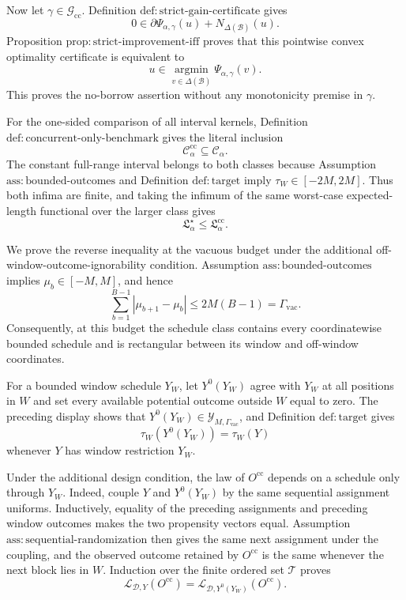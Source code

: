 Now let \(\gamma\in\mathcal G_{\mathrm{cc}}\).  Definition \(\mathrm{def:strict\text{-}gain\text{-}certificate}\) gives
\[
 0\in\partial\Psi_{\alpha,\gamma}(u)
      +N_{\Delta(\mathcal B)}(u).
\]
Proposition \(\mathrm{prop:strict\text{-}improvement\text{-}iff}\) proves that this pointwise convex optimality certificate is equivalent to
\[
 u\in\operatorname*{argmin}_{v\in\Delta(\mathcal B)}
 \Psi_{\alpha,\gamma}(v).
\]
This proves the no-borrow assertion without any monotonicity premise in \(\gamma\).

For the one-sided comparison of all interval kernels, Definition \(\mathrm{def:concurrent\text{-}only\text{-}benchmark}\) gives the literal inclusion
\[
 \mathcal C_\alpha^{\mathrm{cc}}\subseteq\mathcal C_\alpha.
\]
The constant full-range interval belongs to both classes because Assumption \(\mathrm{ass:bounded\text{-}outcomes}\) and Definition \(\mathrm{def:target}\) imply \(\tau_W\in[-2M,2M]\).  Thus both infima are finite, and taking the infimum of the same worst-case expected-length functional over the larger class gives
\[
 \mathfrak L_\alpha^\star\le\mathfrak L_\alpha^{\mathrm{cc}}.
\]

We prove the reverse inequality at the vacuous budget under the additional off-window-outcome-ignorability condition.  Assumption \(\mathrm{ass:bounded\text{-}outcomes}\) implies \(\mu_b\in[-M,M]\), and hence
\[
 \sum_{b=1}^{B-1}|\mu_{b+1}-\mu_b|
 \le 2M(B-1)=\Gamma_{\mathrm{vac}}.
\]
Consequently, at this budget the schedule class contains every coordinatewise bounded schedule and is rectangular between its window and off-window coordinates.

For a bounded window schedule \(Y_W\), let \(Y^0(Y_W)\) agree with \(Y_W\) at all positions in \(W\) and set every available potential outcome outside \(W\) equal to zero.  The preceding display shows that \(Y^0(Y_W)\in\mathcal Y_{M,\Gamma_{\mathrm{vac}}}\), and Definition \(\mathrm{def:target}\) gives
\[
 \tau_W(Y^0(Y_W))=\tau_W(Y)
\]
whenever \(Y\) has window restriction \(Y_W\).

Under the additional design condition, the law of \(O^{\mathrm{cc}}\) depends on a schedule only through \(Y_W\).  Indeed, couple \(Y\) and \(Y^0(Y_W)\) by the same sequential assignment uniforms.  Inductively, equality of the preceding assignments and preceding window outcomes makes the two propensity vectors equal.  Assumption \(\mathrm{ass:sequential\text{-}randomization}\) then gives the same next assignment under the coupling, and the observed outcome retained by \(O^{\mathrm{cc}}\) is the same whenever the next block lies in \(W\).  Induction over the finite ordered set \(\mathcal T\) proves
\[
 \mathcal L_{\mathcal D,Y}(O^{\mathrm{cc}})
 =\mathcal L_{\mathcal D,Y^0(Y_W)}(O^{\mathrm{cc}}).
\]

